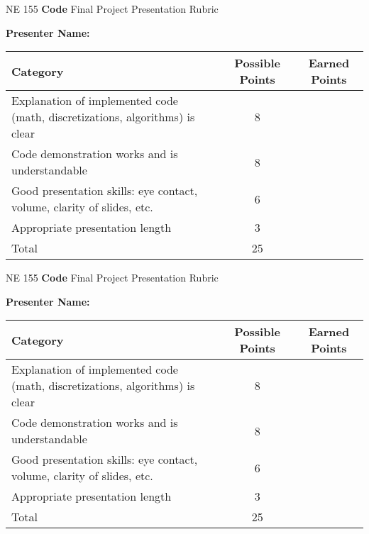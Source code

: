\documentclass[a4paper, 12 pt]{curve}
\begin{document}
NE 155 \textbf{Code} Final Project Presentation Rubric


\textbf{Presenter Name:}\makebox[4in]{\hrulefill}
\vspace*{1 em}
\begin{center}
\begin{tabu}{| X | c | c |}\hline
\textbf{Category} & \textbf{Possible Points} & \textbf{Earned Points} \\ \hline \hline
Explanation of implemented code (math, discretizations, algorithms) is clear & 8 & \\ \hline
Code demonstration works and is understandable & 8 & \\ \hline
Good presentation skills: eye contact, volume, clarity of slides, etc. & 6 & \\ \hline
Appropriate presentation length & 3 & \\ \hline
Total & 25 & \\\hline
\end{tabu} 
\end{center}


\vspace*{4em}

NE 155 \textbf{Code} Final Project Presentation Rubric


\textbf{Presenter Name:}\makebox[4in]{\hrulefill}
\vspace*{1 em}
\begin{center}
\begin{tabu}{| X | c | c |}\hline
\textbf{Category} & \textbf{Possible Points} & \textbf{Earned Points} \\ \hline \hline
Explanation of implemented code (math, discretizations, algorithms) is clear & 8 & \\ \hline
Code demonstration works and is understandable & 8 & \\ \hline
Good presentation skills: eye contact, volume, clarity of slides, etc. & 6 & \\ \hline
Appropriate presentation length & 3 & \\ \hline
Total & 25 & \\\hline
\end{tabu} 
\end{center}
\end{document}
